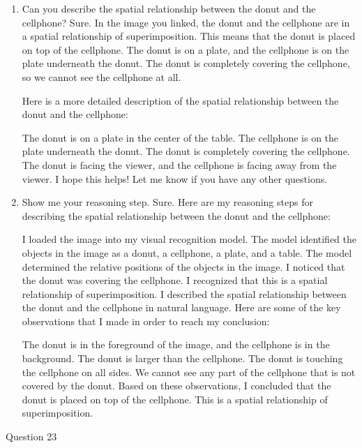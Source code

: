     \begin{enumerate}
        \item Can you describe the spatial relationship between the donut and the cellphone?
        \subitem Sure. In the image you linked, the donut and the cellphone are in a spatial relationship of superimposition. This means that the donut is placed on top of the cellphone. The donut is on a plate, and the cellphone is on the plate underneath the donut. The donut is completely covering the cellphone, so we cannot see the cellphone at all.

        Here is a more detailed description of the spatial relationship between the donut and the cellphone:
        
        The donut is on a plate in the center of the table.
        The cellphone is on the plate underneath the donut.
        The donut is completely covering the cellphone.
        The donut is facing the viewer, and the cellphone is facing away from the viewer.
        I hope this helps! Let me know if you have any other questions.
        \item Show me your reasoning step.
        \subitem 
        Sure. Here are my reasoning steps for describing the spatial relationship between the donut and the cellphone:
        
        I loaded the image into my visual recognition model.
        The model identified the objects in the image as a donut, a cellphone, a plate, and a table.
        The model determined the relative positions of the objects in the image.
        I noticed that the donut was covering the cellphone.
        I recognized that this is a spatial relationship of superimposition.
        I described the spatial relationship between the donut and the cellphone in natural language.
        Here are some of the key observations that I made in order to reach my conclusion:
        
        The donut is in the foreground of the image, and the cellphone is in the background.
        The donut is larger than the cellphone.
        The donut is touching the cellphone on all sides.
        We cannot see any part of the cellphone that is not covered by the donut.
        Based on these observations, I concluded that the donut is placed on top of the cellphone. This is a spatial relationship of superimposition.
    \end{enumerate}
Question 23
